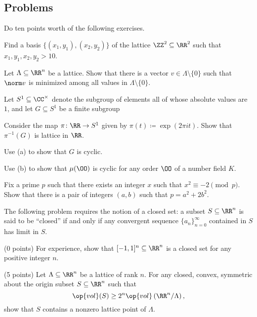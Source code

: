 \documentclass[../notes.tex]{subfiles}
\begin{document}
\subsection{Problems}
Do ten points worth of the following exercises.
\begin{prob}[1 point]
	Find a basis $\{(x_1,y_1),(x_2,y_2)\}$ of the lattice $\ZZ^2\subseteq\RR^2$ such that $x_1,y_1,x_2,y_2>10$.
\end{prob}
\begin{prob}[2 points]
	Let $\Lambda\subseteq\RR^n$ be a lattice. Show that there is a vector $v\in\Lambda\setminus\{0\}$ such that $\norm v$ is minimized among all values in $\Lambda\setminus\{0\}$.
\end{prob}
\begin{prob}[3 points]
	Let $S^1\subseteq\CC^\times$ denote the subgroup of elements all of whose absolute values are $1$, and let $G\subseteq S^1$ be a finite subgroup 
	\begin{listalph}
		\item Consider the map $\pi\colon\RR\to S^1$ given by $\pi(t)\coloneqq\exp(2\pi it)$. Show that $\pi^{-1}(G)$ is lattice in $\RR$.
		\item Use (a) to show that $G$ is cyclic.
		\item Use (b) to show that $\mu(\OO)$ is cyclic for any order $\OO$ of a number field $K$.
	\end{listalph}
\end{prob}
\begin{prob}[4 points]
	Fix a prime $p$ such that there exists an integer $x$ such that $x^2\equiv-2\pmod p$. Show that there is a pair of integers $(a,b)$ such that $p=a^2+2b^2$.
\end{prob}
\begin{prob}[5 points]
	The following problem requires the notion of a closed set: a subset $S\subseteq\RR^n$ is said to be ``closed'' if and only if any convergent sequence $\{a_n\}_{n=0}^\infty$ contained in $S$ has limit in $S$.
	\begin{listalph}
		\item (0 points) For experience, show that $[-1,1]^n\subseteq\RR^n$ is a closed set for any positive integer $n$.
		\item (5 points) Let $\Lambda\subseteq\RR^n$ be a lattice of rank $n$. For any closed, convex, symmetric about the origin subset $S\subseteq\RR^n$ such that
		\[\op{vol}(S)\ge2^n\op{vol}\left(\RR^n/\Lambda\right),\]
		show that $S$ contains a nonzero lattice point of $\Lambda$.
	\end{listalph}
\end{prob}
\end{document}
